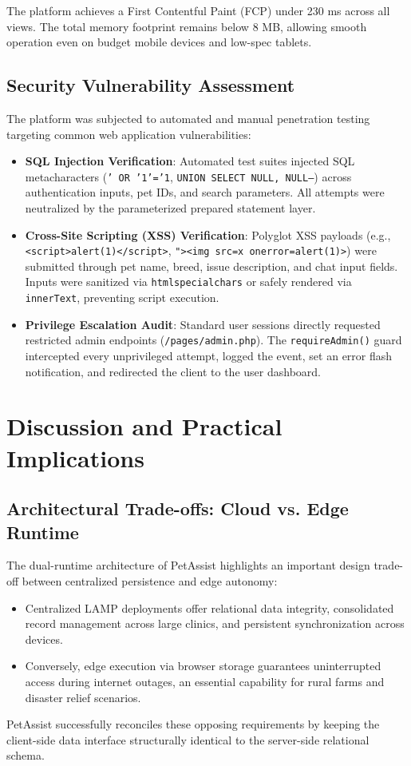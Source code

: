 \documentclass[conference]{IEEEtran}
\begin{document}
The platform achieves a First Contentful Paint (FCP) under 230 ms across all views. The total memory footprint remains below 8 MB, allowing smooth operation even on budget mobile devices and low-spec tablets.

\subsection{Security Vulnerability Assessment}
The platform was subjected to automated and manual penetration testing targeting common web application vulnerabilities:
\begin{itemize}
    \item \textbf{SQL Injection Verification}: Automated test suites injected SQL metacharacters (\texttt{' OR '1'='1}, \texttt{UNION SELECT NULL, NULL--}) across authentication inputs, pet IDs, and search parameters. All attempts were neutralized by the parameterized prepared statement layer.
    \item \textbf{Cross-Site Scripting (XSS) Verification}: Polyglot XSS payloads (e.g., \texttt{<script>alert(1)</script>}, \texttt{"><img src=x onerror=alert(1)>}) were submitted through pet name, breed, issue description, and chat input fields. Inputs were sanitized via \texttt{htmlspecialchars} or safely rendered via \texttt{innerText}, preventing script execution.
    \item \textbf{Privilege Escalation Audit}: Standard user sessions directly requested restricted admin endpoints (\texttt{/pages/admin.php}). The \texttt{requireAdmin()} guard intercepted every unprivileged attempt, logged the event, set an error flash notification, and redirected the client to the user dashboard.
\end{itemize}

\section{Discussion and Practical Implications}
\subsection{Architectural Trade-offs: Cloud vs. Edge Runtime}
The dual-runtime architecture of PetAssist highlights an important design trade-off between centralized persistence and edge autonomy:
\begin{itemize}
    \item Centralized LAMP deployments offer relational data integrity, consolidated record management across large clinics, and persistent synchronization across devices.
    \item Conversely, edge execution via browser storage guarantees uninterrupted access during internet outages, an essential capability for rural farms and disaster relief scenarios.
\end{itemize}
PetAssist successfully reconciles these opposing requirements by keeping the client-side data interface structurally identical to the server-side relational schema.
\end{document}

